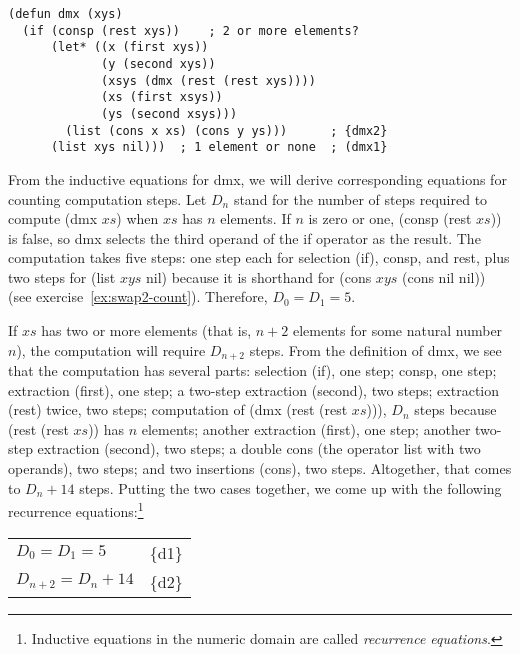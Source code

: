 \label{defun:dmx-copy}
\begin{code}
\begin{verbatim}
(defun dmx (xys)
  (if (consp (rest xys))    ; 2 or more elements?
      (let* ((x (first xys))
             (y (second xys))
             (xsys (dmx (rest (rest xys))))
             (xs (first xsys))
             (ys (second xsys)))
        (list (cons x xs) (cons y ys)))      ; {dmx2}
      (list xys nil)))  ; 1 element or none  ; (dmx1}
\end{verbatim}
\end{code}

From the inductive equations for \textsf{dmx},
we will derive corresponding equations for counting computation steps.
Let $D_n$ stand for the number of steps required
to compute \textsf{(dmx $xs$)} when $xs$ has $n$ elements.
If $n$ is zero or one, \textsf{(consp (rest $xs$))} is false,
so \textsf{dmx} selects the third operand of the \textsf{if}
operator as the result.
The computation takes five steps: one step each for selection (\textsf{if}),
\textsf{consp}, and \textsf{rest},
plus two steps for \textsf{(list $xys$ nil)}
because it is shorthand for \textsf{(cons $xys$ (cons nil nil))}
(see exercise~\ref{ex:swap2-count}).
Therefore, $D_0 = D_1 = 5$.

If $xs$ has two or more elements (that is, $n+2$ elements
for some natural number $n$),
the computation will require $D_{n+2}$ steps.
From the definition of \textsf{dmx}, we see that the computation
has several parts:
selection (\textsf{if}), one step;
\textsf{consp}, one step;
extraction (\textsf{first}), one step;
a two-step extraction (\textsf{second}), two steps;
extraction (\textsf{rest}) twice, two steps;
computation of \textsf{(dmx (rest (rest $xs$)))},
$D_n$ steps because \textsf{(rest (rest $xs$))} has $n$ elements;
another extraction (\textsf{first}), one step;
another two-step extraction (\textsf{second}), two steps;
a double \textsf{cons}
(the operator \textsf{list} with two operands), two steps;
and two insertions (\textsf{cons}), two steps.
Altogether, that comes to $D_n + 14$ steps.
Putting the two cases together,
we come up with the following recurrence equations:\footnote{Inductive
equations in the numeric domain are called
\label{def:recurrence-equations}\emph{recurrence equations}.}\\[-6mm]
\begin{center}
\begin{tabular}{ll}
  $D_0 = D_1 = 5$      & \{d1\} \\
  $D_{n+2} = D_n + 14$ & \{d2\} \\
\end{tabular}
\end{center}

